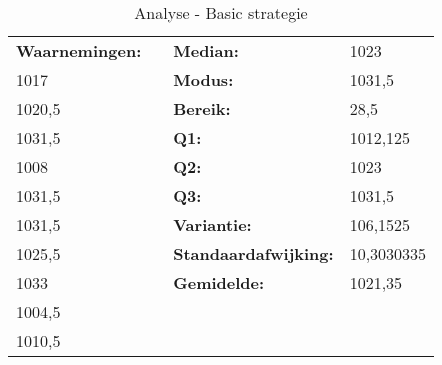 \documentclass[conference]{IEEEtran}
\begin{document}
\begin{table}[htbp]
\caption{Analyse - Basic strategie}
\tiny
\centering
\begin{tabular}{|l|lll}
\cline{1-1} \cline{3-4}
\textbf{Waarnemingen:} & \multicolumn{1}{l|}{} & \multicolumn{1}{l|}{\textbf{Median:}} & \multicolumn{1}{l|}{1023} \\ \cline{1-1} \cline{3-4} 
1017 & \multicolumn{1}{l|}{} & \multicolumn{1}{l|}{\textbf{Modus:}} & \multicolumn{1}{l|}{1031,5} \\ \cline{1-1} \cline{3-4} 
1020,5 & \multicolumn{1}{l|}{} & \multicolumn{1}{l|}{\textbf{Bereik:}} & \multicolumn{1}{l|}{28,5} \\ \cline{1-1} \cline{3-4} 
1031,5 & \multicolumn{1}{l|}{} & \multicolumn{1}{l|}{\textbf{Q1:}} & \multicolumn{1}{l|}{1012,125} \\ \cline{1-1} \cline{3-4} 
1008 & \multicolumn{1}{l|}{} & \multicolumn{1}{l|}{\textbf{Q2:}} & \multicolumn{1}{l|}{1023} \\ \cline{1-1} \cline{3-4} 
1031,5 & \multicolumn{1}{l|}{} & \multicolumn{1}{l|}{\textbf{Q3:}} & \multicolumn{1}{l|}{1031,5} \\ \cline{1-1} \cline{3-4} 
1031,5 & \multicolumn{1}{l|}{} & \multicolumn{1}{l|}{\textbf{Variantie:}} & \multicolumn{1}{l|}{106,1525} \\ \cline{1-1} \cline{3-4} 
1025,5 & \multicolumn{1}{l|}{} & \multicolumn{1}{l|}{\textbf{Standaardafwijking:}} & \multicolumn{1}{l|}{10,3030335} \\ \cline{1-1} \cline{3-4} 
1033 & \multicolumn{1}{l|}{} & \multicolumn{1}{l|}{\textbf{Gemidelde:}} & \multicolumn{1}{l|}{1021,35} \\ \cline{1-1} \cline{3-4} 
1004,5 &  &  &  \\ \cline{1-1}
1010,5 &  & \textbf{} &  \\ \cline{1-1}
\end{tabular}
\end{table}
\end{document}
